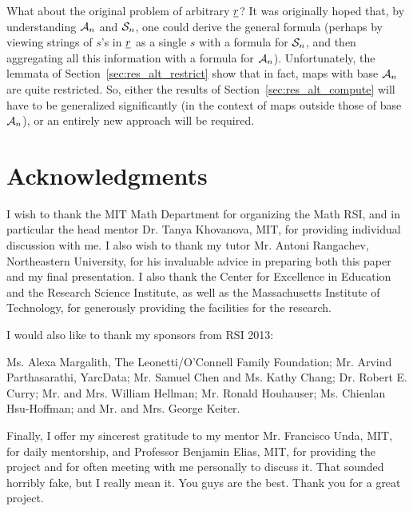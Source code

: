 What about the original problem of arbitrary $\ul r$?  It was originally hoped that, by understanding $\AA_n$ and $\SS_n$, one could derive the general formula (perhaps by viewing strings of $s$'s in $\ul r$ as a single $s$ with a formula for $\SS_n$, and then aggregating all this information with a formula for $\AA_n$).  Unfortunately, the lemmata of Section~\ref{sec:res_alt_restrict} show that in fact, maps with base $\AA_n$ are quite restricted.  So, either the results of Section~\ref{sec:res_alt_compute} will have to be generalized significantly (in the context of maps outside those of base $\AA_n$), or an entirely new approach will be required.

\section{Acknowledgments} 
I wish to thank the MIT Math Department for organizing the Math RSI, and in particular the head mentor Dr. Tanya Khovanova, MIT, for providing individual discussion with me.
I also wish to thank my tutor Mr. Antoni Rangachev, Northeastern University, for his invaluable advice in preparing both this paper and my final presentation.
I also thank the Center for Excellence in Education and the Research Science Institute, as well as the Massachusetts Institute of Technology, for generously providing the facilities for the research.

I would also like to thank my sponsors from RSI 2013:
\begin{inparaenum}[]
	\ii Ms. Alexa Margalith, The Leonetti/O'Connell Family Foundation;
	\ii Mr. Arvind Parthasarathi, YarcData;
	\ii Mr. Samuel Chen and Ms. Kathy Chang;
	\ii Dr. Robert E. Curry;
	\ii Mr. and Mrs. William Hellman;
	\ii Mr. Ronald Houhauser;
	\ii Ms. Chienlan Hsu-Hoffman; and
	\ii Mr. and Mrs. George Keiter.
\end{inparaenum}

Finally, I offer my sincerest gratitude to my mentor Mr. Francisco Unda, MIT, for daily mentorship, and Professor Benjamin Elias, MIT, for providing the project and for often meeting with me personally to discuss it.
That sounded horribly fake, but I really mean it.  You guys are the best.  Thank you for a great project.
